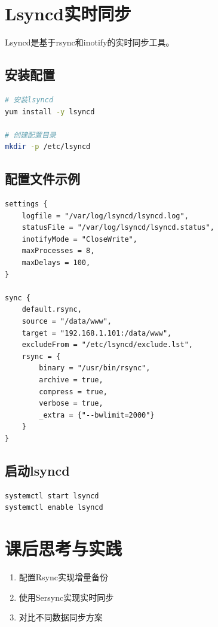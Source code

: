 \documentclass[12pt,UTF8]{ctexbook}
\begin{document}
\section{Lsyncd实时同步}
\label{sec:lsyncd}

Lsyncd是基于rsync和inotify的实时同步工具。

\subsection*{安装配置}
\begin{lstlisting}[language=bash]
# 安装lsyncd
yum install -y lsyncd

# 创建配置目录
mkdir -p /etc/lsyncd
\end{lstlisting}

\subsection*{配置文件示例}
\begin{lstlisting}
settings {
    logfile = "/var/log/lsyncd/lsyncd.log",
    statusFile = "/var/log/lsyncd/lsyncd.status",
    inotifyMode = "CloseWrite",
    maxProcesses = 8,
    maxDelays = 100,
}

sync {
    default.rsync,
    source = "/data/www",
    target = "192.168.1.101:/data/www",
    excludeFrom = "/etc/lsyncd/exclude.lst",
    rsync = {
        binary = "/usr/bin/rsync",
        archive = true,
        compress = true,
        verbose = true,
        _extra = {"--bwlimit=2000"}
    }
}
\end{lstlisting}

\subsection*{启动lsyncd}
\begin{lstlisting}[language=bash]
systemctl start lsyncd
systemctl enable lsyncd
\end{lstlisting}

\section{课后思考与实践}
\label{sec:data-sync-practice}
\begin{enumerate}
    \item 配置Rsync实现增量备份
    \item 使用Sersync实现实时同步
    \item 对比不同数据同步方案
\end{enumerate}
\end{document}
